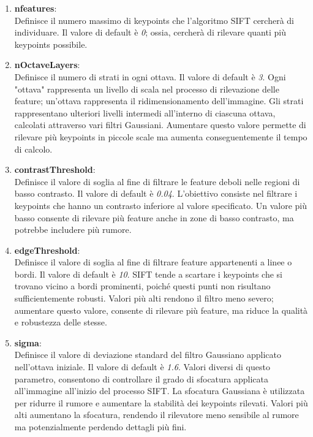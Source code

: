 \documentclass[12pt,a4paper,openright,twoside]{book}
\begin{document}
\begin{enumerate}
\item \textbf{nfeatures}:\\
Definisce il numero massimo di keypoints che l'algoritmo SIFT cercherà di individuare. Il valore di default è {\itshape 0}; ossia, cercherà di rilevare quanti più keypoints possibile.
\item \textbf{nOctaveLayers}:\\
Definisce il numero di strati in ogni ottava.  Il valore di default è {\itshape 3}. Ogni "ottava" rappresenta un livello di scala nel processo di rilevazione delle feature; un'ottava rappresenta il ridimensionamento dell'immagine. Gli strati rappresentano ulteriori livelli intermedi all'interno di ciascuna ottava, calcolati attraverso vari filtri Gaussiani. Aumentare questo valore permette di rilevare più keypoints in piccole scale ma aumenta conseguentemente il tempo di calcolo.
\item \textbf{contrastThreshold}:\\
Definisce il valore di soglia al fine di filtrare le feature deboli nelle regioni di basso contrasto. Il valore di default è {\itshape 0.04}. L'obiettivo consiste nel filtrare i keypoints che hanno un contrasto inferiore al valore specificato. Un valore più basso consente di rilevare più feature anche in zone di basso contrasto, ma potrebbe includere più rumore.
\item \textbf{edgeThreshold}:\\
Definisce il valore di soglia al fine di filtrare feature appartenenti a linee o bordi. Il valore di default è {\itshape 10}. SIFT tende a scartare i keypoints che si trovano vicino a bordi prominenti, poiché questi punti non risultano sufficientemente robusti. Valori più alti rendono il filtro meno severo; aumentare questo valore, consente di rilevare più feature, ma riduce la qualità e robustezza delle stesse.
\item \textbf{sigma}:\\
Definisce il valore di deviazione standard del filtro Gaussiano applicato nell'ottava iniziale. Il valore di default è {\itshape1.6}. Valori diversi di questo parametro, consentono di controllare il grado di sfocatura applicata all'immagine all'inizio del processo SIFT. La sfocatura Gaussiana è utilizzata per ridurre il rumore e aumentare la stabilità dei keypoints rilevati. Valori più alti aumentano la sfocatura, rendendo il rilevatore meno sensibile al rumore ma potenzialmente perdendo dettagli più fini.
\end{enumerate}
\end{document}

